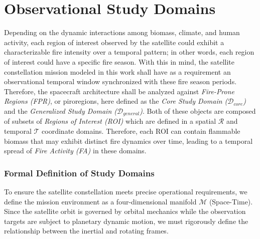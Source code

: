 \section{Observational Study Domains} \label{sec:obs_domains}

Depending on the dynamic interactions among biomass, climate, and human activity, each region of interest observed by the satellite could exhibit a characterizable fire intensity over a temporal pattern; in other words, each region of interest could have a specific fire season. With this in mind, the satellite constellation mission modeled in this work shall have as a requirement an observational temporal window synchronized with these fire season periods. Therefore, the spacecraft architecture shall be analyzed against\textit{ Fire-Prone Regions (FPR)}, or piroregions, here defined as the \textit{Core Study Domain ($\mathcal{D}_{core}$)} and the \textit{Generalized Study Domain ($\mathcal{D}_{general}$)}. Both of these objects are composed of subsets of \textit{Regions of Interest (ROI)} which are defined in a spatial $\mathcal{R}$ and temporal $\mathcal{T}$ coordinate domains. Therefore, each ROI can contain flammable biomass that may exhibit distinct fire dynamics over time, leading to a temporal spread of \textit{Fire Activity (FA)} in these domains. 

\subsubsection{Formal Definition of Study Domains}\label{sec:formal_def_domains}

To ensure the satellite constellation meets precise operational requirements, we define the mission environment as a four-dimensional manifold $\mathcal{M}$ (Space-Time). Since the satellite orbit is governed by orbital mechanics while the observation targets are subject to planetary dynamic motion, we must rigorously define the relationship between the inertial and rotating frames.

